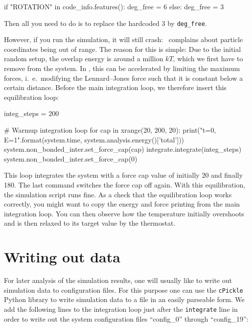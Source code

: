 \documentclass[
a4paper,                        %
11pt,                           %
twoside,                        %
footsepline,                    %
headsepline,                    %
headexclude,                    %
footexclude,                    %
pagesize,                       %
]{scrartcl}
\begin{document}
\begin{tclcode}
if "ROTATION" in code_info.features():
    deg_free = 6
else:
    deg_free = 3
\end{tclcode}

Then all you need to do is to replace the hardcoded 3 by \verb|deg_free|.

However, if you run the simulation, it will still
crash: \es\ complains about particle coordinates being out of range.
The reason for this is simple: Due to the initial random setup, the
overlap energy is around a million $kT$, which we first have to remove
from the system. In \es, this can be accelerated by limiting the maximum
forces, i.~e.\ modifying the Lennard--Jones force such that it is
constant below a certain distance. Before the main integration loop, we
therefore insert this equilibration loop:

\begin{tclcode}
integ_steps = 200

# Warmup integration loop
for cap in xrange(20, 200, 20):
    print("t={0}, E={1}".format(system.time,
                                system.analysis.energy()['total']))
    system.non_bonded_inter.set_force_cap(cap)
    integrate.integrate(integ_steps)
system.non_bonded_inter.set_force_cap(0)
\end{tclcode}

This loop integrates the system with a force cap value of initially 20 and
finally 180.  The last command switches the force cap off again. With
this equilibration, the simulation script runs fine. As a check
that the equilibration loop works correctly, you might want to copy the
energy and force printing from the main integration loop. You can then
observe how the temperature initially overshoots and is then relaxed to
its target value by the thermostat.

\section{Writing out data}

For later analysis of the simulation results, one will
usually like to write out simulation data to configuration files.
For this purpose one can use the \verb|cPickle| Python library to 
write simulation data to a file in an easily parseable form.  We add the 
following lines to the integration loop just after the \verb|integrate| line
in order to write out the system configuration files
``config\_0'' through ``config\_19'':
\end{document}
